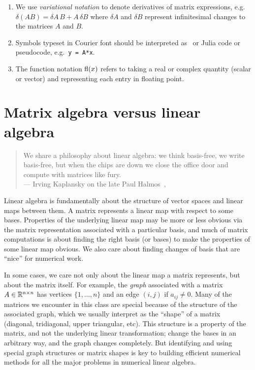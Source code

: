 \documentclass[12pt, leqno]{article}
\begin{document}
\begin{enumerate}
\item
  We use {\em variational notation} to denote derivatives of matrix
  expressions, e.g.~$\delta (AB) = \delta A \, B + A \, \delta B$ where
  $\delta A$ and $\delta B$ represent infinitesimal changes to the
  matrices $A$ and $B$.

\item
  Symbols typeset in Courier font should be interpreted as \matlab\ or
  Julia code or pseudocode, e.g.~{\tt y = A*x}.

\item
  The function notation $\operatorname{fl}(x)$ refers to taking a real or complex
  quantity (scalar or vector) and representing each entry in floating
  point.

\end{enumerate}

\section{Matrix algebra versus linear algebra}

\begin{quotation}
  We share a philosophy about linear algebra: we think basis-free, we write basis-free, but when the chips are down we close the office door and compute with matrices like fury. \\
  \hspace*{\fill} --- Irving Kaplansky
  on the late Paul Halmos~\cite{Ewing:1991:Halmos},
\end{quotation}

Linear algebra is fundamentally about the structure of vector spaces
and linear maps between them.  A matrix represents a linear map with
respect to some bases.  Properties of the underlying linear map may
be more or less obvious via the matrix representation associated with
a particular basis, and much of matrix computations is about finding
the right basis (or bases) to make the properties of some linear map
obvious.  We also care about finding changes of basis that are ``nice''
for numerical work.

In some cases, we care not only about the linear map a matrix
represents, but about the matrix itself.  For example, the {\em graph}
associated with a matrix $A \in \mathbb{R}^{n \times n}$ has vertices $\{1,
\ldots, n\}$ and an edge $(i,j)$ if $a_{ij} \neq 0$.  Many of the
matrices we encounter in this class are special because of the structure
of the associated graph, which we usually interpret as the ``shape'' of
a matrix (diagonal, tridiagonal, upper triangular, etc).  This structure
is a property of the matrix, and not the underlying linear
transformation; change the bases in an arbitrary way, and the graph
changes completely.  But identifying and using special graph structures
or matrix shapes is key to building efficient numerical methods for all
the major problems in numerical linear algebra.
\end{document}
